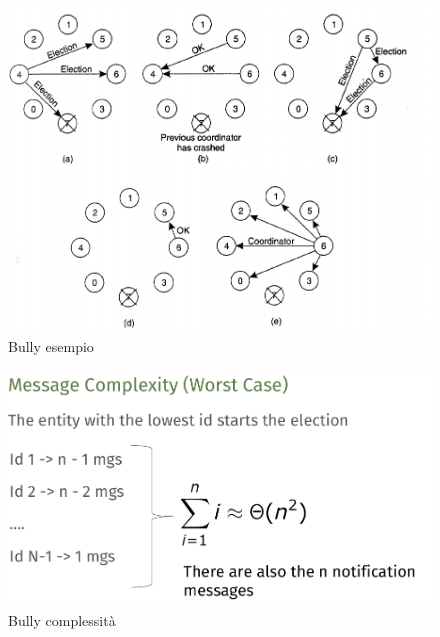 \documentclass[12pt]{article}
\begin{document}
			\begin{figure}[h!]
				\centering
				\includegraphics[scale=0.40]{img/ex.png}
				\caption{Bully esempio}
			\end{figure}
			\begin{figure}[h!]
				\centering
				\includegraphics[scale=0.40]{img/bullycomp.png}
				\caption{Bully complessità}
			\end{figure}
\end{document}

